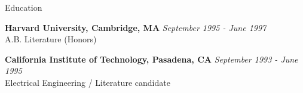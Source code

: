 \documentclass{resume} %
\begin{document}

\begin{rSection}{Education}

{\bf Harvard University, Cambridge, MA} \hfill {\em September 1995 - June 1997} \\ 
A.B. Literature (Honors)

{\bf California Institute of Technology, Pasadena, CA} \hfill {\em September 1993 - June 1995} \\ 
Electrical Engineering / Literature candidate\\

\end{rSection}





\end{document}
